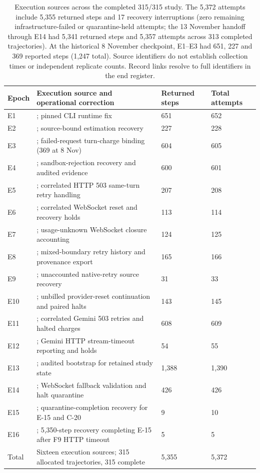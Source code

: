 \begin{table}[!htbp]
\centering\footnotesize
\caption{Execution sources across the completed 315/315 study. The 5,372
attempts include 5,355 returned steps and 17 recovery interruptions (zero
remaining infrastructure-failed or quarantine-held attempts; the 13 November
handoff through E14 had 5,341 returned steps and 5,357 attempts across
313 completed trajectories). At the historical 8 November checkpoint, E1--E3
had 651, 227 and 369 reported steps (1,247 total). Source identifiers do
not establish collection times or independent replicate counts. Record
links resolve to full identifiers in the end register.}\label{tab:executionepochs}

\begin{tabularx}{\textwidth}{@{}L{0.9cm}YL{1.6cm}L{1.6cm}@{}}
\toprule
Epoch & Execution source and operational correction & Returned steps & Total attempts \\
\midrule
E1 & ; pinned CLI runtime fix & 651 & 652 \\
E2 & ; source-bound estimation recovery & 227 & 228 \\
E3 & ; failed-request turn-charge binding (369 at 8 Nov) & 604 & 605 \\
E4 & ; sandbox-rejection recovery and audited evidence & 600 & 601 \\
E5 & ; correlated HTTP 503 same-turn retry handling & 207 & 208 \\
E6 & ; correlated WebSocket reset and recovery holds & 113 & 114 \\
E7 & ; usage-unknown WebSocket closure accounting & 124 & 125 \\
E8 & ; mixed-boundary retry history and provenance export & 165 & 166 \\
E9 & ; unaccounted native-retry source recovery & 31 & 33 \\
E10 & ; unbilled provider-reset continuation and paired halts & 143 & 145 \\
E11 & ; correlated Gemini 503 retries and halted charges & 608 & 609 \\
E12 & ; Gemini HTTP stream-timeout reporting and holds & 54 & 55 \\
E13 & ; audited bootstrap for retained study state & 1,388 & 1,390 \\
E14 & ; WebSocket fallback validation and halt quarantine & 426 & 426 \\
E15 & ; quarantine-completion recovery for E-15 and C-20 & 9 & 10 \\
E16 & ; 5,350-step recovery completing E-15 after F9 HTTP timeout & 5 & 5 \\
\midrule
Total & Sixteen execution sources; 315 allocated trajectories, 315 complete & 5,355 & 5,372 \\
\bottomrule
\end{tabularx}
\end{table}

